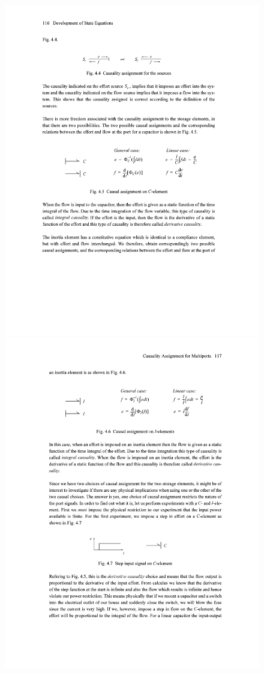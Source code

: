\begin{figure}[H]
\begin{minipage}{.5\textwidth}
        \label{fig:bond_graph2}
    \end{minipage}%
    \begin{minipage}{.5\textwidth}
        \centering
        \includegraphics[width=.9\linewidth]{figures/fig45.pdf}
        \includegraphics[width=.9\linewidth]{figures/fig46.pdf}

\end{minipage}
\end{figure}
